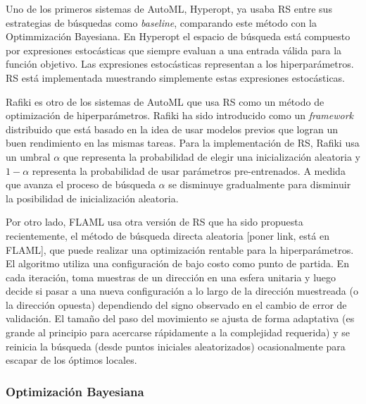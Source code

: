 Uno de los primeros sistemas de AutoML, Hyperopt, ya usaba RS entre sus estrategias de búsquedas como \textit{baseline}, comparando este método con la Optimmización Bayesiana. En Hyperopt el espacio de búsqueda está compuesto por expresiones estocásticas que siempre evaluan a una entrada válida para la función objetivo. Las expresiones estocásticas representan a los hiperparámetros. RS está implementada muestrando simplemente estas expresiones estocásticas.

Rafiki es otro de los sistemas de AutoML que usa RS como un método de optimización de hiperparámetros. Rafiki ha sido introducido como un \textit{framework} distribuido que está basado en la idea de usar modelos previos que logran un buen rendimiento en las mismas tareas. Para la implementación de RS, Rafiki usa un umbral $\alpha$ que representa la probabilidad de elegir una inicialización aleatoria y $1 - \alpha$ representa la probabilidad de usar parámetros pre-entrenados. A medida que avanza el proceso de búsqueda $\alpha$ se disminuye gradualmente para disminuir la posibilidad de inicialización aleatoria.

Por otro lado, FLAML usa otra versión de RS que ha sido propuesta recientemente, el método de búsqueda directa aleatoria [poner link, está en FLAML], que puede realizar una optimización rentable para la hiperparámetros. El algoritmo utiliza una configuración de bajo costo como punto de partida. En cada iteración, toma muestras de un dirección en una esfera unitaria y luego decide si pasar a una nueva configuración a lo largo de la dirección muestreada (o la dirección opuesta) dependiendo del signo observado en el cambio de error de validación. El tamaño del paso del movimiento se ajusta de forma adaptativa (es grande al principio para acercarse rápidamente a la complejidad requerida) y se reinicia la búsqueda (desde puntos iniciales aleatorizados) ocasionalmente para escapar de los óptimos locales.

\subsubsection{Optimización Bayesiana}


